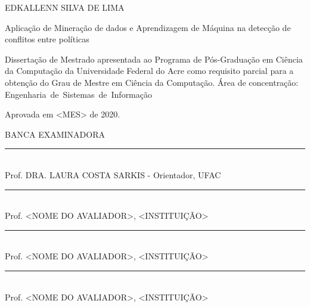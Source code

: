 \documentclass[
	12pt,				%
	openright,			%
	twoside,			%
	a4paper,			%
	english,			%
	french,				%
	spanish,			%
	brazil				%
	]{abntex2}
\begin{document}
\vspace{-60mm}

\begin{center}
	{\large EDKALLENN SILVA DE LIMA}\\
	\vspace{7mm}
	
	Aplicação de Mineração de dados e Aprendizagem de Máquina na detecção de conflitos entre políticas\\
	\vspace{10mm}
\end{center}

\noindent
\begin{flushright}
	\begin{minipage}[t]{8cm}
		
		Dissertação de Mestrado apresentada ao Programa de Pós-Gradua\c{c}\~{a}o em Ciência da Computação da Universidade Federal do Acre como requisito parcial para a obtenção do Grau de Mestre em Ciência da Computação. \'{A}rea de concentra\c{c}\~{a}o: \mbox{Engenharia de Sistemas de Informação} 
		
	\end{minipage}
\end{flushright}
\vspace{1.0 cm}
\noindent
{Aprovada em <MES> de 2020.} \\
\begin{flushright}
	\parbox{11cm}
	{
		\begin{center}
			BANCA EXAMINADORA \\
			\vspace{6mm}
			\rule{11cm}{.1mm} \\
			Prof. DRA. LAURA COSTA SARKIS - Orientador, UFAC \\
			\vspace{6mm}
			\rule{11cm}{.1mm} \\
			Prof. <NOME DO AVALIADOR>, <INSTITUI\c{C}\~AO>\\
			\vspace{6mm}
			\rule{11cm}{.1mm} \\
			Prof. <NOME DO AVALIADOR>, <INSTITUI\c{C}\~AO>\\
			\vspace{4mm}
			\rule{11cm}{.1mm} \\
			Prof. <NOME DO AVALIADOR>, <INSTITUI\c{C}\~AO>\\
			\vspace{6mm}
			
		\end{center}
	}
\end{flushright}
\end{document}
